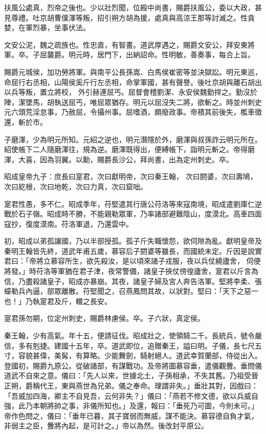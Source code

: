 \begin{pinyinscope}
 扶風公處真，烈帝之後也。少以壯烈聞，位殿中尚書，賜爵扶風公，委以大政，甚見尊禮。吐京胡曹僕渾等叛，招引朔方胡為援，處真與高涼王那等討滅之。性貪婪，在軍烈暴，坐事伏法。



 文安公泥，魏之疏族也。性忠直，有智畫。道武厚遇之，賜爵文安公，拜安東將軍。卒。子屈襲爵。明元時，居門下，出納詔命。性明敏，善奏事，每合上旨。



 賜爵元城侯，加功勞將軍。與南平公長孫嵩、白馬侯崔密等並決獄訟。明元東巡，命屈行右丞相，山陽侯奚斤行左丞相，命掌軍國，甚有聲譽。後吐京胡與離石胡出以兵等叛，置立將校，
 外引赫連屈丐。屈督會稽劉潔、永安侯魏勤捍之。勤沒於陣，潔墜馬，胡執送屈丐，唯屈眾猶存。明元以屈沒失二將，欲斬之。時並州刺史元六頭荒淫怠事，乃赦屈，令攝州事。屈嗜酒，頗廢政事。帝積其前後失，檻車徵還，斬於市。



 子磨渾，少為明元所知。元紹之逆也，明元潛隱於外，磨渾與叔孫詐云明元所在。紹使帳下二人隨磨渾往，規為逆。磨渾既得出，便縛帳下，詣明元斬之。帝得磨渾，大喜，因為羽翼。以勳，賜爵長沙公，拜尚書，出為定州刺史。卒。



 昭成皇帝九子：庶長曰寔君，次曰獻明帝，次曰秦王翰，
 次曰閼婆，次曰壽鳩，次曰紇根，次曰地乾，次曰力真，次曰窟咄。



 寔君性愚，多不仁。昭成季年，苻堅遣其行唐公苻洛等來寇南境，昭成遣劉庫仁逆戰於石子嶺。昭成時不勝，不能親勒眾軍，乃率諸部避難陰山，度漠北。高車四面寇抄，復度漠南。苻洛軍退，乃還雲中。



 初，昭成以弟孤讓國，乃以半部授孤。孤子斤失職懷怨，欲伺隙為亂。獻明皇帝及秦明王翰皆先終，道武年甫五歲，慕容后子閼婆等雖長，而國統未定。斤因是說實君曰：「帝將立慕容所生，欲先殺汝，是以頃來諸子戎服，夜以兵仗繞廬舍，
 伺便將發。」時苻洛等軍猶在君子津，夜常警備，諸皇子挾仗徬徨廬舍，寔君以斤言為信，乃盡殺諸皇子，昭成亦暴崩。其夜，諸皇子婦及宮人奔告洛軍。堅將李柔、張蠔勒兵內逼，部眾離散。苻堅聞之，召燕鳳問其故，以狀對。堅曰：「天下之惡一也！」乃執寔君及斤，轘之長安。



 寔君孫勿期，位定州刺史，賜爵林慮侯。卒。子六狀，真定侯。



 秦王翰，少有高氣。年十五，便請征伐。昭成壯之，使領騎二千。長統兵，號令嚴信，多有剋捷。建國十五年，卒。道武即位，追贈秦王，謚曰明。子儀，長七尺五寸，容貌甚偉，美髯，有算略。少能舞劍，騎射絕人。道武幸賀蘭部，侍從出入。
 登國初，賜爵九原公。從破諸部，有謀戰功。及帝將圖慕容垂，遣儀觀釁。垂問儀道武不自來之意。儀曰：「先人以來，世據北土，子孫相承，不失其舊。乃祖受晉正朔，爵稱代王，東與燕世為兄弟。儀之奉命。理謂非失。」垂壯其對，因戲曰：「吾威加四海，卿主不自見吾，云何非失？」儀曰：「燕若不修文德，欲以兵威自強，此乃本朝將帥之事，非儀所知也。」及還，報曰：「垂死乃可圖，今則未可。」帝作色問之，儀曰：「垂年已暮，其子寶弱而無威，謀不能決。慕容德自負才氣，非弱主之臣，釁將內起，是可計之。」帝以為然。後改封平原公。




\end{pinyinscope}
